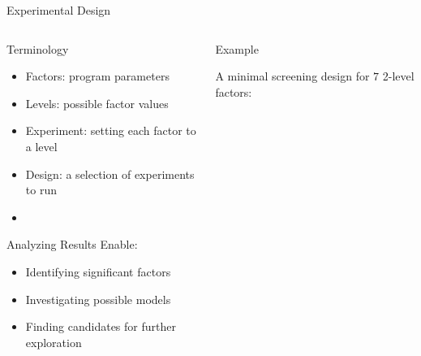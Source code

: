 \documentclass[10pt, compress, aspectratio=169, xcolor={table,usenames,dvipsnames}]{beamer}
\begin{document}
\begin{frame}[label={sec:orgddae9b9}]{Experimental Design}
\begin{columns}
\begin{column}{0.5\columnwidth}
\begin{block}{Terminology}
\begin{itemize}
\item Factors: program parameters
\item Levels: possible factor values
\item Experiment: setting each factor to a level
\item Design: a selection of experiments to run
\item {}
\end{itemize}

\begin{block}{Analyzing Results Enable:}
\begin{itemize}
\item Identifying \alert{significant factors}
\item Investigating possible \alert{models}
\item Finding \alert{candidates} for further exploration
\end{itemize}
\end{block}
\end{block}
\end{column}

\begin{column}{0.5\columnwidth}
\begin{block}{Example}
\vspace{-.2cm}
\begin{center}

A minimal screening design for \(7\) 2-level factors:

\end{center}
\vspace{-.2cm}


\vspace{-.2cm}

\end{block}
\end{column}
\end{columns}
\end{frame}
\end{document}
